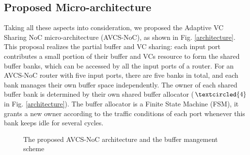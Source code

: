 \documentclass[10pt,conference]{IEEEtran}
\begin{document}
\subsection{Proposed Micro-architecture}
Taking all these aspects into consideration, we proposed the Adaptive VC Sharing NoC micro-architecture (AVCS-NoC), as shown in Fig. \ref{architecture}. This proposal realizes the partial buffer and VC sharing: each input port contributes a small portion of their buffer and VCs resource to form the shared buffer banks, which can be accessed by all the input ports of a router. For an AVCS-NoC router with five input ports, there are five banks in total, and each bank manages their own buffer space independently. The owner of each shared buffer bank is determined by their own shared buffer allocator ($\textcircled{4}$ in Fig. \ref{architecture}). The buffer allocator is a Finite State Machine (FSM), it grants a new owner according to the traffic conditions of each port whenever this bank keeps idle for several cycles.
\begin{figure}
  \centering
  \hspace{10pt}
  \caption{The proposed AVCS-NoC architecture and the buffer mangement scheme}
\end{figure}
\end{document}
